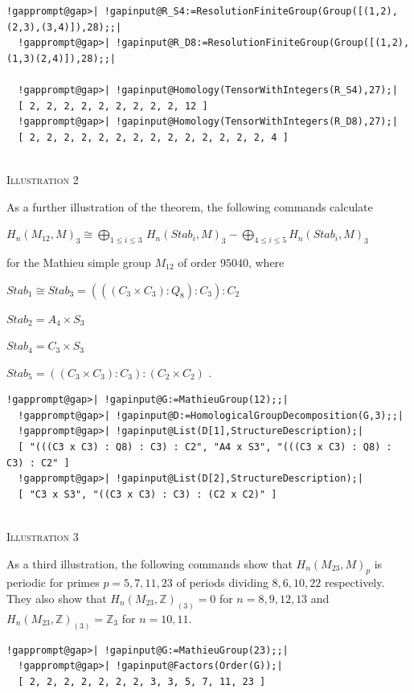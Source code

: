 \documentclass[a4paper,11pt]{report}
\begin{document}
{{\begin{Verbatim}[commandchars=!@|,fontsize=\small,frame=single,label=Example]
  !gapprompt@gap>| !gapinput@R_S4:=ResolutionFiniteGroup(Group([(1,2),(2,3),(3,4)]),28);;|
  !gapprompt@gap>| !gapinput@R_D8:=ResolutionFiniteGroup(Group([(1,2),(1,3)(2,4)]),28);;|
  
  !gapprompt@gap>| !gapinput@Homology(TensorWithIntegers(R_S4),27);|
  [ 2, 2, 2, 2, 2, 2, 2, 2, 2, 12 ]
  !gapprompt@gap>| !gapinput@Homology(TensorWithIntegers(R_D8),27);|
  [ 2, 2, 2, 2, 2, 2, 2, 2, 2, 2, 2, 2, 2, 2, 4 ]
  
\end{Verbatim}
 

\textsc{Illustration 2} 

 As a further illustration of the theorem, the following commands calculate 

 $H_n(M_{12},M)_3 \cong \bigoplus_{1\le i\le 3}\,H_n(Stab_i,M)_3 -
\bigoplus_{4\le i\le 5}H_n(Stab_i,M)_3$ 

 for the Mathieu simple group $M_{12}$ of order $95040$, where 

$Stab_1\cong Stab_3=(((C_3 \times C_3) : Q_8) : C_3) : C_2$ 

$Stab_2=A_4 \times S_3$ 

$Stab_4=C_3 \times S_3$ 

$Stab_5=((C_3 \times C_3) : C_3) : (C_2 \times C_2)$ . 
\begin{Verbatim}[commandchars=!@|,fontsize=\small,frame=single,label=Example]
  !gapprompt@gap>| !gapinput@G:=MathieuGroup(12);;|
  !gapprompt@gap>| !gapinput@D:=HomologicalGroupDecomposition(G,3);;|
  !gapprompt@gap>| !gapinput@List(D[1],StructureDescription);|
  [ "(((C3 x C3) : Q8) : C3) : C2", "A4 x S3", "(((C3 x C3) : Q8) : C3) : C2" ]
  !gapprompt@gap>| !gapinput@List(D[2],StructureDescription);|
  [ "C3 x S3", "((C3 x C3) : C3) : (C2 x C2)" ]
  
\end{Verbatim}
 

\textsc{Illustration 3} 

 As a third illustration, the following commands show that $H_n(M_{23},M)_{p}$ is periodic for primes $p=5, 7, 11, 23$ of periods dividing $8, 6, 10, 22$ respectively. They also show that $H_n(M_{23},\mathbb Z)_{(3)}=0$ for $n=8,9,12,13$ and $H_n(M_{23},\mathbb Z)_{(3)}=\mathbb Z_3$ for $n=10,11$. 
\begin{Verbatim}[commandchars=!@|,fontsize=\small,frame=single,label=Example]
  !gapprompt@gap>| !gapinput@G:=MathieuGroup(23);;|
  !gapprompt@gap>| !gapinput@Factors(Order(G));|
  [ 2, 2, 2, 2, 2, 2, 2, 3, 3, 5, 7, 11, 23 ]
  

\end{Verbatim}}}
\end{document}

